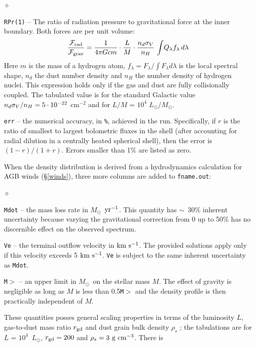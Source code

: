 \documentclass[11pt]{article}
\def\E#1{\hbox{$10^{#1}$}}
\def\eq#1{\begin{equation} #1 \end{equation}}
\def\about  {\hbox{$\sim$}}
\def\Mo     {\hbox{$M_{\odot}$}}
\def\Lo     {\hbox{$L_{\odot}$}}
\def\kms    {\hbox{$\rm km\ s^{-1}$}}
\def\sub#1{_{\rm #1}}
\def\Frad {\hbox{${\cal F}\sub{rad}$}}
\def\Fgrav{\hbox{${\cal F}\sub{grav}$}}
\begin{document}
\begin{list}{$\diamond$}{}
\item {\tt RPr(1)} -- The ratio of radiation pressure to gravitational force
    at the inner boundary. Both forces are per unit volume:
  \eq{ {\Frad\over\Fgrav} = {1\over4\pi Gcm} \cdot{L\over
      M}\cdot{n_d\sigma_V\over n_H}\, \int\!Q_\lambda f_\lambda\,d\lambda }
  Here $m$ is the mass of a hydrogen atom,  $f_\lambda = F_\lambda/\int
  F_\lambda d\lambda$ is the local spectral shape, $n_d$ the dust number
  density and $n_H$ the number density of hydrogen nuclei.  This expression
  holds only if the gas and dust are fully collisionally coupled. The
  tabulated value is for the standard Galactic value $n_d\sigma_V/n_H =
  5\cdot\E{-22}$ cm$^{-2}$ and for $L/M$ = \E4 \Lo/\Mo.

\item {\tt err} -- the numerical accuracy, in {\tt \%}, achieved in
  the run.  Specifically, if $r$ is the ratio of smallest to largest
  bolometric fluxes in the shell (after accounting for radial dilution
  in a centrally heated spherical shell), then the error is $(1 -
  r)/(1 + r)$. Errors smaller than 1\% are listed as zero.

\end{list}
When the density distribution is derived from a hydrodynamics
calculation for AGB winds (\S\ref{winds}), three more columns are
added to {\tt fname.out}:
\begin{list}{$\diamond$}{}
\item {\tt Mdot} -- the mass loss rate in \Mo\ $\rm yr^{-1}$.  This
  quantity has \about\ 30\% inherent uncertainty because varying the
  gravitational correction from 0 up to 50\% has no discernible effect
  on the observed spectrum.

\item {\tt Ve} -- the terminal outflow velocity in \kms. The provided
  solutions apply only if this velocity exceeds 5 \kms.  {\tt Ve} is
  subject to the same inherent uncertainty as {\tt Mdot}.
\item {\tt M$>$} -- an upper limit in \Mo\ on the stellar mass $M$.
  The effect of gravity is negligible as long as $M$ is less than
  0.5{\tt *M$>$} and the density profile is then practically
  independent of $M$.

\end{list}
These quantities posses general scaling properties in terms of the
luminosity $L$, gas-to-dust mass ratio $r_{\rm gd}$ and dust grain
bulk density $\rho_s$ \cite{EI01, IE10}; the tabulations are for $L$ =
\E4\ \Lo, $r_{\rm gd} = 200$ and $\rho_s = 3\ \rm g~cm^{-3}$. There is
\end{document}
